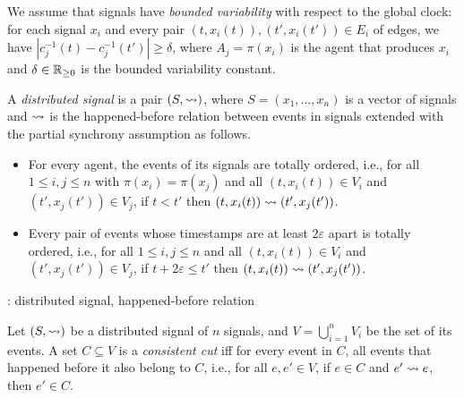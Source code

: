 We assume that signals have \emph{bounded variability} with respect to the global clock: for each 
signal $x_i$ and every pair $(t, x_i(t)), (t', x_i(t')) \in E_i$ of edges, we have $|c_j^{-1}(t) - 
c_j^{-1}(t')| \geq \delta$, where $A_j = \pi(x_i)$ is the agent that produces $x_i$ and $\delta \in 
\mathbb{R}_{\geq 0}$ is the bounded variability constant. 

\begin{definition} \label{defn:hb}
	A \emph{distributed signal} is a pair $(S, {\rightsquigarrow})$, where $S = (x_1, \ldots, x_n)$ is a vector of 
	signals and ${\rightsquigarrow}$ is the happened-before relation between events in signals extended with the 
	partial synchrony assumption as follows.
	\begin{itemize}
		\item For every agent, the events of its signals are totally ordered, i.e., for all $1 \leq i,j \leq n$ 
		with $\pi(x_i) = \pi(x_j)$ and all $(t, x_i(t)) \in V_i$ and $(t', x_j(t')) \in V_j$, if $t < t'$ then $(t, 
		x_i(t)) \rightsquigarrow (t', x_j(t'))$.
		\item Every pair of events whose timestamps are at least $2 \varepsilon$ apart is totally ordered, i.e., for all $1 \leq i,j \leq n$ and all $(t, x_i(t)) \in V_i$ and $(t', x_j(t')) \in V_j$, if $t + 2\varepsilon \leq t'$ then $(t, x_i(t)) \rightsquigarrow (t', x_j(t'))$.  
 
	\end{itemize}
\end{definition}

\begin{example}
	\TODO: distributed signal, happened-before relation
\end{example}

\begin{definition}
	Let $(S, {\rightsquigarrow})$ be a distributed signal of $n$ signals, and $V = \bigcup_{i = 1}^{n} V_i$ be the set of its events.
	A set $C \subseteq V$ is a \emph{consistent cut} iff for every event in $C$, all events that happened before  it also belong to $C$, i.e., for all $e, e' \in V$, if $e \in C$ and $e' \rightsquigarrow e$, then $e' \in C$.
\end{definition}

